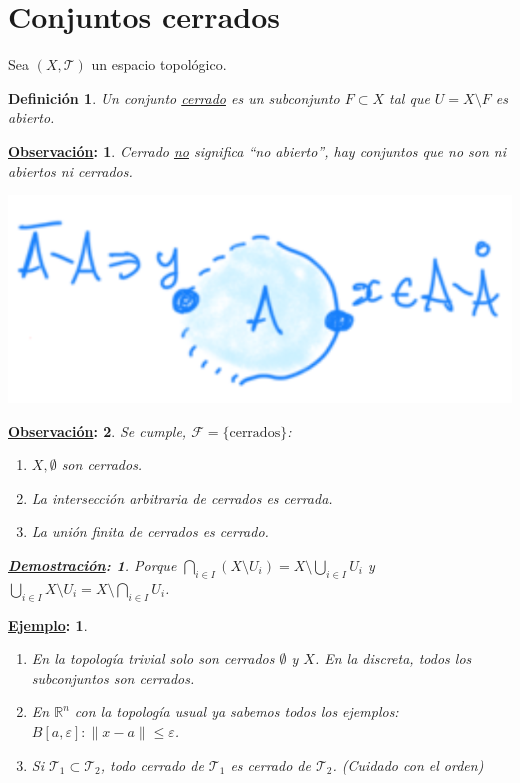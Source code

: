 \documentclass[10pt,a4paper,openright]{book}
\theoremstyle{break}
\newtheorem*{defi}{Definición}
\newtheorem*{demo}{\underline{Demostración}:}
\newtheorem*{obs}{\underline{Observación}:}
\newtheorem*{ej}{\underline{Ejemplo}:}
\begin{document}
\section{Conjuntos cerrados}%
\label{sec:conjuntos_cerrados}
Sea $\left( X, \mathcal{T} \right)$ un espacio topológico.
\begin{defi}
Un conjunto \underline{cerrado} es un subconjunto $F \subset X$ tal que $U = X \setminus F$ es abierto.
\end{defi}
\begin{obs}
    Cerrado \underline{no} significa ``no abierto'', hay conjuntos que no son ni abiertos ni cerrados.
    \begin{center}
        \includegraphics[scale=0.3]{images/def_cerrados} 
    \end{center}
\end{obs}
\begin{obs}
Se cumple, $\mathcal{F} = \{\text{cerrados}\}$:
\begin{enumerate}
    \item $X, \emptyset$ son cerrados.
    \item La intersección arbitraria de cerrados es cerrada.
    \item La unión finita de cerrados es cerrado.
\end{enumerate}
\begin{demo}
    Porque $\bigcap_{i \in  I} \left( X \setminus U_i \right) = X \setminus \bigcup_{i \in  I} U_i$ y $\bigcup_{i \in  I} X \setminus U_i = X \setminus \bigcap_{i \in  I} U_i$.
\end{demo}
\end{obs}

\begin{ej}
\begin{enumerate}
    \item En la topología trivial solo son cerrados $\emptyset$ y $X$. En la discreta, todos los subconjuntos son cerrados.
    \item En $\mathbb{R}^n$ con la topología usual ya sabemos todos los ejemplos: $B\left[ a, \varepsilon \right] : \lVert x - a \rVert \le \varepsilon$.
    \item Si $\mathcal{T}_1 \subset \mathcal{T}_2$, todo cerrado de $\mathcal{T}_1$ es cerrado de $\mathcal{T}_2$. (Cuidado con el orden) 
\end{enumerate}
\end{ej}
\end{document}
